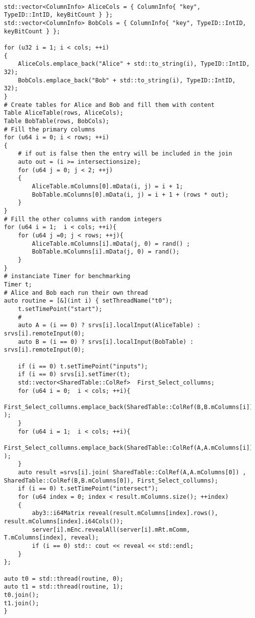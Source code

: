 \begin{lstlisting}[caption={Simpifiyed Protocol for our first use-case in ABY3}]

std::vector<ColumnInfo> AliceCols = { ColumnInfo{ "key", TypeID::IntID, keyBitCount } };
std::vector<ColumnInfo> BobCols = { ColumnInfo{ "key", TypeID::IntID, keyBitCount } };

for (u32 i = 1; i < cols; ++i)
{
	AliceCols.emplace_back("Alice" + std::to_string(i), TypeID::IntID, 32);
	BobCols.emplace_back("Bob" + std::to_string(i), TypeID::IntID, 32);
}
# Create tables for Alice and Bob and fill them with content
Table AliceTable(rows, AliceCols);
Table BobTable(rows, BobCols);
# Fill the primary columns 
for (u64 i = 0; i < rows; ++i)
{
	# if out is false then the entry will be included in the join
	auto out = (i >= intersectionsize);
	for (u64 j = 0; j < 2; ++j)
	{
		AliceTable.mColumns[0].mData(i, j) = i + 1;
		BobTable.mColumns[0].mData(i, j) = i + 1 + (rows * out);
	}
}
# Fill the other columns with random integers
for (u64 i = 1;  i < cols; ++i){
	for (u64 j =0; j < rows; ++j){
		AliceTable.mColumns[i].mData(j, 0) = rand() ;
		BobTable.mColumns[i].mData(j, 0) = rand();	
	}
}
# instanciate Timer for benchmarking
Timer t;
# Alice and Bob each run their own thread 
auto routine = [&](int i) { setThreadName("t0");
	t.setTimePoint("start");
	# 
	auto A = (i == 0) ? srvs[i].localInput(AliceTable) : srvs[i].remoteInput(0);
	auto B = (i == 0) ? srvs[i].localInput(BobTable) : srvs[i].remoteInput(0);
	
	if (i == 0) t.setTimePoint("inputs");
	if (i == 0) srvs[i].setTimer(t);
	std::vector<SharedTable::ColRef>  First_Select_collumns;		
	for (u64 i = 0;  i < cols; ++i){
		First_Select_collumns.emplace_back(SharedTable::ColRef(B,B.mColumns[i]) );
	}
	for (u64 i = 1;  i < cols; ++i){
		First_Select_collumns.emplace_back(SharedTable::ColRef(A,A.mColumns[i]) );
	}
	auto result =srvs[i].join( SharedTable::ColRef(A,A.mColumns[0]) , SharedTable::ColRef(B,B.mColumns[0]), First_Select_collumns);
	if (i == 0) t.setTimePoint("intersect");
	for (u64 index = 0; index < result.mColumns.size(); ++index)
	{
		aby3::i64Matrix reveal(result.mColumns[index].rows(),  result.mColumns[index].i64Cols());
		server[i].mEnc.revealAll(server[i].mRt.mComm, T.mColumns[index], reveal);
		if (i == 0) std:: cout << reveal << std::endl;	
	}
};

auto t0 = std::thread(routine, 0);
auto t1 = std::thread(routine, 1);
t0.join();
t1.join();
}
\end{lstlisting}
